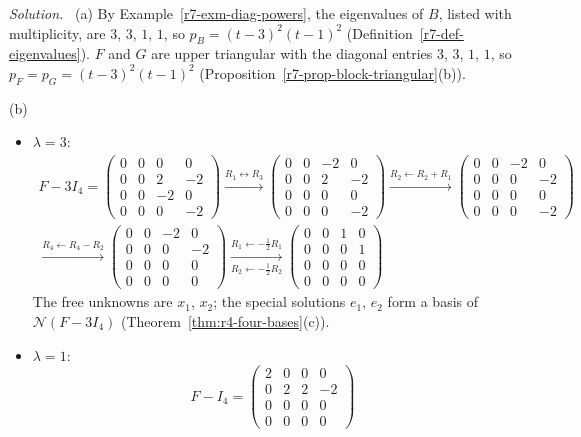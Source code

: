\documentclass[12pt]{article}
\theoremstyle{definition}
\newenvironment{solution}{\par\noindent\textit{Solution.}\ }{\par\smallskip}
\begin{document}
\begin{solution}
(a) By Example~\ref{r7-exm-diag-powers}, the eigenvalues of \(B\), listed with multiplicity, are \(3\), \(3\), \(1\),
\(1\), so \(p_B=(t-3)^2(t-1)^2\) (Definition~\ref{r7-def-eigenvalues}). \(F\) and \(G\) are upper triangular with the
diagonal entries \(3\), \(3\), \(1\), \(1\), so \(p_F=p_G=(t-3)^2(t-1)^2\) (Proposition~\ref{r7-prop-block-triangular}(b)).

(b)
\begin{itemize}
\item \(\lambda=3\):
\[
\begin{gathered}
F-3I_4=\begin{pmatrix}0&0&0&0\\0&0&2&-2\\0&0&-2&0\\0&0&0&-2\end{pmatrix}
\xrightarrow{R_1\leftrightarrow R_3}
\begin{pmatrix}0&0&-2&0\\0&0&2&-2\\0&0&0&0\\0&0&0&-2\end{pmatrix}
\xrightarrow{R_2\leftarrow R_2+R_1}
\begin{pmatrix}0&0&-2&0\\0&0&0&-2\\0&0&0&0\\0&0&0&-2\end{pmatrix}
\\
\xrightarrow{R_4\leftarrow R_4-R_2}
\begin{pmatrix}0&0&-2&0\\0&0&0&-2\\0&0&0&0\\0&0&0&0\end{pmatrix}
\xrightarrow[R_2\leftarrow-\frac12R_2]{R_1\leftarrow-\frac12R_1}
\begin{pmatrix}0&0&1&0\\0&0&0&1\\0&0&0&0\\0&0&0&0\end{pmatrix}
\end{gathered}
\]
The free unknowns are \(x_1\), \(x_2\); the special solutions \(e_1\), \(e_2\) form a basis of \(\mathcal N(F-3I_4)\)
(Theorem~\ref{thm:r4-four-bases}(c)).
\item \(\lambda=1\):
\[
F-I_4=\begin{pmatrix}2&0&0&0\\0&2&2&-2\\0&0&0&0\\0&0&0&0\end{pmatrix}
\]
\end{itemize}
\end{solution}
\end{document}
